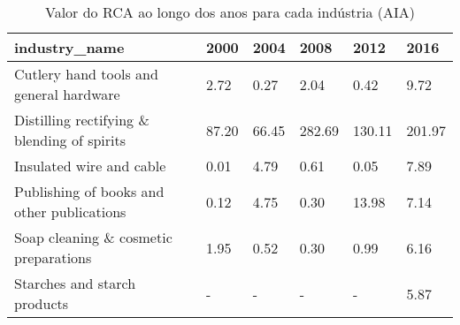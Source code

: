 \begin{table}
\centering
\caption{Valor do RCA ao longo dos anos para cada indústria (AIA)}
\begin{tabular}{p{6cm}p{1.5cm}p{1.5cm}p{1.5cm}p{1.5cm}p{1.5cm}}
\toprule
                              industry\_name &  2000 &  2004 &   2008 &   2012 &   2016 \\
\midrule
    Cutlery hand tools and general hardware &  2.72 &  0.27 &   2.04 &   0.42 &   9.72 \\
Distilling rectifying \& blending of spirits & 87.20 & 66.45 & 282.69 & 130.11 & 201.97 \\
                   Insulated wire and cable &  0.01 &  4.79 &   0.61 &   0.05 &   7.89 \\
 Publishing of books and other publications &  0.12 &  4.75 &   0.30 &  13.98 &   7.14 \\
      Soap cleaning \& cosmetic preparations &  1.95 &  0.52 &   0.30 &   0.99 &   6.16 \\
               Starches and starch products &     - &     - &      - &      - &   5.87 \\
\bottomrule
\end{tabular}
\end{table}
